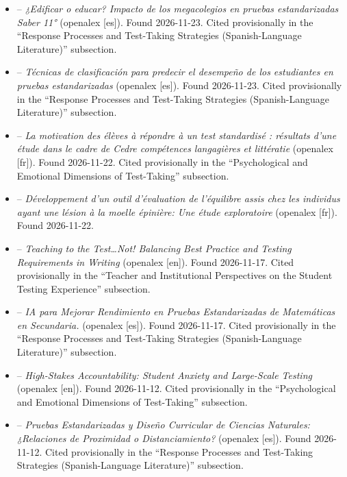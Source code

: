\documentclass[11pt]{article}
\begin{document}
\begin{itemize}[leftmargin=*]
\item \citet{velasco2014megacolegios} -- \emph{¿Edificar o educar? Impacto de los megacolegios en pruebas estandarizadas Saber 11°} (openalex [es]). Found 2026-11-23. Cited provisionally in the ``Response Processes and Test-Taking Strategies (Spanish-Language Literature)'' subsection.
\item \citet{contreras2024tecnicas} -- \emph{Técnicas de clasificación para predecir el desempeño de los estudiantes en pruebas estandarizadas} (openalex [es]). Found 2026-11-23. Cited provisionally in the ``Response Processes and Test-Taking Strategies (Spanish-Language Literature)'' subsection.
\item \citet{fumel2017motivation} -- \emph{La motivation des élèves à répondre à un test standardisé : résultats d'une étude dans le cadre de Cedre compétences langagières et littératie} (openalex [fr]). Found 2026-11-22. Cited provisionally in the ``Psychological and Emotional Dimensions of Test-Taking'' subsection.
\item \citet{lepage2012equilibre} -- \emph{Développement d'un outil d'évaluation de l'équilibre assis chez les individus ayant une lésion à la moelle épinière: Une étude exploratoire} (openalex [fr]). Found 2026-11-22.
\item \citet{higgins2006teachingtest} -- \emph{Teaching to the Test…Not! Balancing Best Practice and Testing Requirements in Writing} (openalex [en]). Found 2026-11-17. Cited provisionally in the ``Teacher and Institutional Perspectives on the Student Testing Experience'' subsection.
\item \citet{latorresoles2025iamatematicas} -- \emph{IA para Mejorar Rendimiento en Pruebas Estandarizadas de Matemáticas en Secundaria.} (openalex [es]). Found 2026-11-17. Cited provisionally in the ``Response Processes and Test-Taking Strategies (Spanish-Language Literature)'' subsection.
\item \citet{vonderembse2014highstakes} -- \emph{High-Stakes Accountability: Student Anxiety and Large-Scale Testing} (openalex [en]). Found 2026-11-12. Cited provisionally in the ``Psychological and Emotional Dimensions of Test-Taking'' subsection.
\item \citet{cardenasbonilla2026pruebas} -- \emph{Pruebas Estandarizadas y Diseño Curricular de Ciencias Naturales: ¿Relaciones de Proximidad o Distanciamiento?} (openalex [es]). Found 2026-11-12. Cited provisionally in the ``Response Processes and Test-Taking Strategies (Spanish-Language Literature)'' subsection.

\end{itemize}
\end{document}

